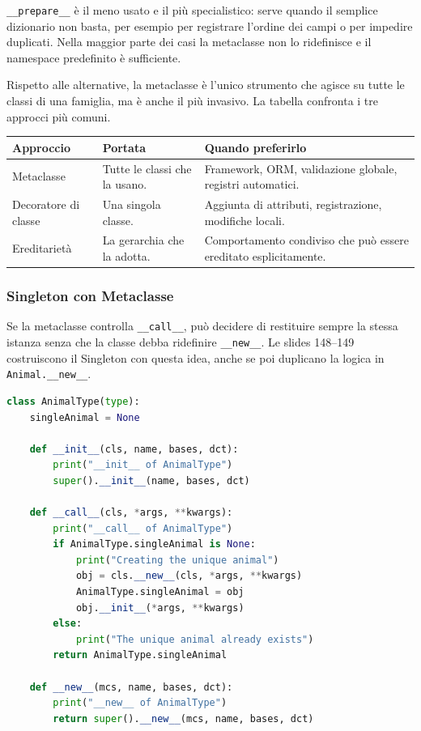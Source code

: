 \documentclass[12pt]{extarticle}
\begin{document}
\noindent \texttt{\_\_prepare\_\_} è il meno usato e il più specialistico: serve quando il semplice dizionario non basta, per esempio per registrare l'ordine dei campi o per impedire duplicati. Nella maggior parte dei casi la metaclasse non lo ridefinisce e il namespace predefinito è sufficiente.

\noindent Rispetto alle alternative, la metaclasse è l'unico strumento che agisce su tutte le classi di una famiglia, ma è anche il più invasivo. La tabella confronta i tre approcci più comuni.

\begin{center}
\small
\begin{tabular}{p{3.8cm}p{5.4cm}p{5.2cm}}
    \toprule
    \textbf{Approccio} & \textbf{Portata} & \textbf{Quando preferirlo} \\
    \midrule
    Metaclasse & Tutte le classi che la usano. & Framework, ORM, validazione globale, registri automatici. \\
    \addlinespace
    Decoratore di classe & Una singola classe. & Aggiunta di attributi, registrazione, modifiche locali. \\
    \addlinespace
    Ereditarietà & La gerarchia che la adotta. & Comportamento condiviso che può essere ereditato esplicitamente. \\
    \bottomrule
\end{tabular}
\end{center}

\subsubsection{Singleton con Metaclasse}

\noindent Se la metaclasse controlla \texttt{\_\_call\_\_}, può decidere di restituire sempre la stessa istanza senza che la classe debba ridefinire \texttt{\_\_new\_\_}. Le slides 148--149 costruiscono il Singleton con questa idea, anche se poi duplicano la logica in \texttt{Animal.\_\_new\_\_}.

\begin{lstlisting}[language=Python]
class AnimalType(type):
    singleAnimal = None

    def __init__(cls, name, bases, dct):
        print("__init__ of AnimalType")
        super().__init__(name, bases, dct)

    def __call__(cls, *args, **kwargs):
        print("__call__ of AnimalType")
        if AnimalType.singleAnimal is None:
            print("Creating the unique animal")
            obj = cls.__new__(cls, *args, **kwargs)
            AnimalType.singleAnimal = obj
            obj.__init__(*args, **kwargs)
        else:
            print("The unique animal already exists")
        return AnimalType.singleAnimal

    def __new__(mcs, name, bases, dct):
        print("__new__ of AnimalType")
        return super().__new__(mcs, name, bases, dct)
\end{lstlisting}
\end{document}

